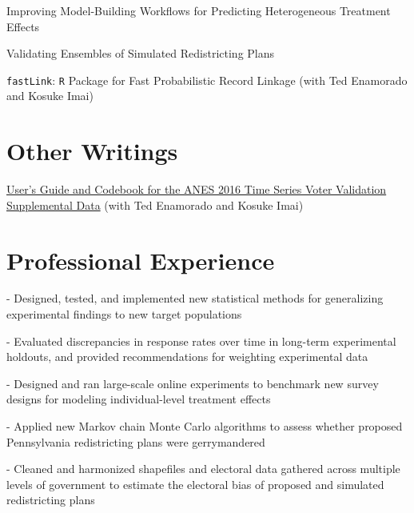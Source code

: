 \documentclass[]{deedy-resume-openfont}
\begin{document}
Improving Model-Building Workflows for Predicting Heterogeneous Treatment Effects\\\vspace{2mm}

Validating Ensembles of Simulated Redistricting Plans\\\vspace{2mm}

\texttt{fastLink}: \texttt{R} Package for Fast Probabilistic Record Linkage (with Ted Enamorado and Kosuke Imai)\\\vspace{2mm}
\sectionsep

\section{Other Writings}
\href{https://www.electionstudies.org/wp-content/uploads/2018/03/anes_timeseries_2016voteval_userguidecodebook.pdf}{User’s Guide and Codebook for the ANES 2016 Time Series Voter Validation Supplemental Data} (with Ted Enamorado and Kosuke Imai)
\sectionsep


\section{Professional Experience}
\begin{tightemize}
\item[-] Designed, tested, and implemented new statistical methods for generalizing experimental findings to new target populations
\item[-] Evaluated discrepancies in response rates over time in long-term experimental holdouts, and provided recommendations for weighting experimental data 
\item[-] Designed and ran large-scale online experiments to benchmark new survey designs for modeling individual-level treatment effects
\end{tightemize}
\sectionsep

\begin{tightemize}
\item[-] Applied new Markov chain Monte Carlo algorithms to assess whether proposed Pennsylvania redistricting plans were gerrymandered
\item[-] Cleaned and harmonized shapefiles and electoral data gathered across multiple levels of government to estimate the electoral bias of proposed and simulated redistricting plans
\end{tightemize}
\sectionsep
\end{document}
